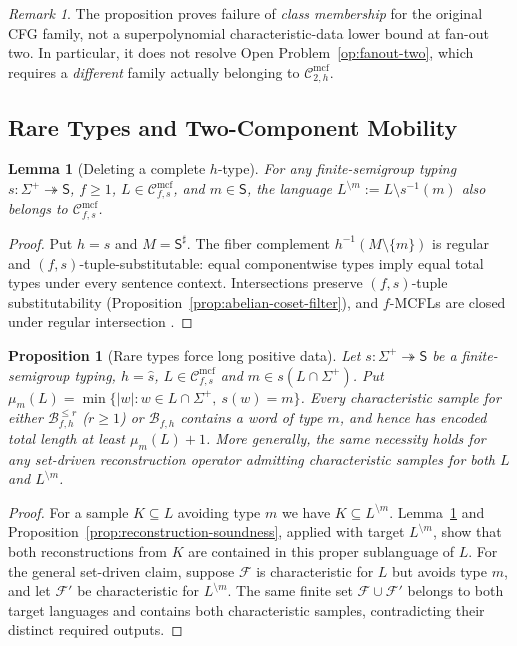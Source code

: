 \documentclass[11pt]{article}
\numberwithin{equation}{section}
\theoremstyle{plain}
\newtheorem{lemma}[theorem]{Lemma}
\newtheorem{proposition}[theorem]{Proposition}
\theoremstyle{definition}
\theoremstyle{remark}
\newtheorem{remark}[theorem]{Remark}
\newcommand{\Cmcf}[2]{\mathcal{C}^{\mathrm{mcf}}_{#1,#2}}
\theoremstyle{plain}
\begin{document}
\begin{remark}
The proposition proves failure of \emph{class membership}
for the original CFG family, not a superpolynomial
characteristic-data lower bound at fan-out two.
In particular, it does not resolve
Open Problem~\ref{op:fanout-two}, which requires a
\emph{different} family actually belonging to
$\Cmcf{2}{h}$.
\end{remark}



\subsection{Rare Types and Two-Component Mobility}
\label{subsec:rare-type-mobility}

\begin{lemma}[Deleting a complete $h$-type]
\label{lem:mcfg-delete-type}
For any finite-semigroup typing $s:\Sigma^+\twoheadrightarrow\mathsf S$,
$f\ge1$, $L\in\Cmcf{f}{s}$, and $m\in\mathsf S$,
the language $L^{\setminus m}:=L\setminus s^{-1}(m)$
also belongs to $\Cmcf{f}{s}$.
\end{lemma}
\begin{proof}
Put $h=\widehat s$ and $M=\mathsf S^\sharp$. The fiber complement
$h^{-1}(M\setminus\{m\})$ is regular and
$(f,s)$-tuple-substitutable: equal componentwise
types imply equal total types under every sentence context.
Intersections preserve $(f,s)$-tuple substitutability
(Proposition~\ref{prop:abelian-coset-filter}),
and $f$-MCFLs are closed under regular intersection
\cite{SekiEtAl1991}.
\end{proof}

\begin{proposition}[Rare types force long positive data]
\label{prop:mcfg-rare-type-sample}
Let $s:\Sigma^+\twoheadrightarrow\mathsf S$ be a finite-semigroup typing,
$h=\widehat s$, $L\in\Cmcf{f}{s}$ and $m\in s(L\cap\Sigma^+)$.
Put $\mu_m(L)=\min\{|w|:w\in L\cap\Sigma^+,\ s(w)=m\}$.
Every characteristic sample for either
$\mathcal B^{\le r}_{f,h}$ ($r\ge1$) or
$\mathcal B_{f,h}$ contains a word of type $m$, and hence has
encoded total length at least $\mu_m(L)+1$.
More generally, the same necessity holds for any set-driven
reconstruction operator admitting characteristic samples for
both $L$ and $L^{\setminus m}$.
\end{proposition}
\begin{proof}
For a sample $K\subseteq L$ avoiding type $m$ we have
$K\subseteq L^{\setminus m}$.
Lemma~\ref{lem:mcfg-delete-type} and
Proposition~\ref{prop:reconstruction-soundness}, applied
with target $L^{\setminus m}$, show that both reconstructions
from $K$ are contained in this proper sublanguage of $L$.
For the general set-driven claim, suppose $\mathcal F$ is
characteristic for $L$ but avoids type $m$, and let
$\mathcal F'$ be characteristic for $L^{\setminus m}$.
The same finite set $\mathcal F\cup\mathcal F'$ belongs to
both target languages and contains both characteristic
samples, contradicting their distinct required outputs.
\end{proof}
\end{document}
